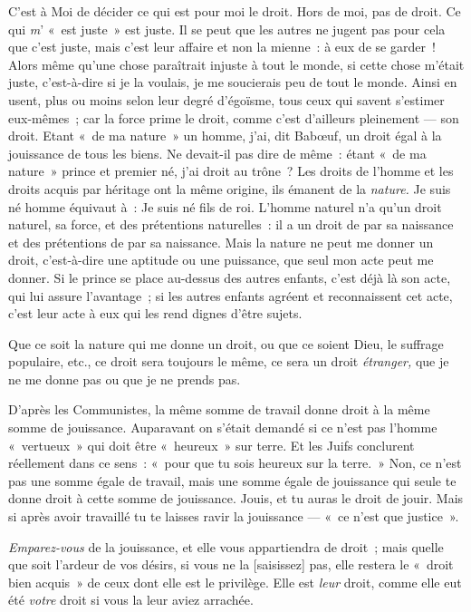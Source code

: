 \documentclass[french,twoside]{book} %
\newcommand\corr[1]{#1}
\begin{document}
C’est à Moi de décider ce qui est pour moi le droit. Hors de moi, pas de droit. Ce qui \emph{m}’ « est juste » est juste. Il se peut que les autres ne jugent pas pour cela que c’est juste, mais c’est leur affaire et non la mienne : à eux de se garder ! Alors même qu’une chose paraîtrait injuste à tout le monde, si cette chose m’était juste, c’est-à-dire si je la voulais, je me soucierais peu de tout le monde. Ainsi en usent, plus ou moins selon leur degré d’égoïsme, tous ceux qui savent s’estimer eux-mêmes ; car la force prime le droit, comme c’est d’ailleurs pleinement — son droit. Etant « de ma nature » un homme, j’ai, dit Babœuf, un droit égal à la jouissance de tous les biens. Ne devait-il pas dire de même : étant « de ma nature »  prince et premier né, j’ai droit au trône ? Les droits de l’homme et les droits acquis par héritage ont la même origine, ils émanent de la \emph{nature.} Je suis né homme équivaut à : Je suis né fils de roi. L’homme naturel n’a qu’un droit naturel, sa force, et des prétentions naturelles : il a un droit de par sa naissance et des prétentions de par sa naissance. Mais la nature ne peut me donner un droit, c’est-à-dire une aptitude ou une puissance, que seul mon acte peut me donner. Si le prince se place au-dessus des autres enfants, c’est déjà là son acte, qui lui assure l’avantage ; si les autres enfants agréent et reconnaissent cet acte, c’est leur acte à eux qui les rend dignes d’être sujets.\par
Que ce soit la nature qui me donne un droit, ou que ce soient Dieu, le suffrage populaire, etc., ce droit sera toujours le même, ce sera un droit \emph{étranger, }que je ne me donne pas ou que je ne prends pas.\par
D’après les Communistes, la même somme de travail donne droit à la même somme de jouissance. Auparavant on s’était demandé si ce n’est pas l’homme « vertueux » qui doit être « heureux » sur terre. Et les Juifs conclurent réellement dans ce sens : « pour que tu sois heureux sur la terre. » Non, ce n’est pas une somme égale de travail, mais une somme égale de jouissance qui seule te donne droit à cette somme de jouissance. Jouis, et tu auras le droit de jouir. Mais si après avoir travaillé tu te laisses ravir la jouissance — « ce n’est que justice ».\par
\emph{Emparez-vous} de la jouissance, et elle vous appartiendra de droit ; mais quelle que soit l’ardeur de vos désirs, si vous ne la [{\corr saisissez}] pas, elle restera le « droit bien acquis » de ceux dont elle est le privilège. Elle est \emph{leur} droit, comme elle eut été \emph{votre} droit si vous la leur aviez arrachée.\par
\end{document}

